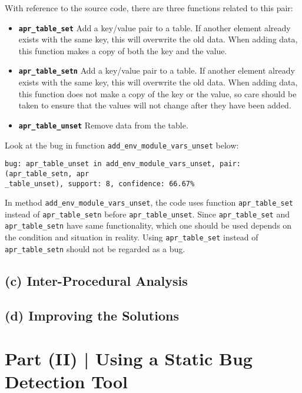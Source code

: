 \documentclass[12pt]{article}
\begin{document}
\begin{enumerate}
With reference to the source code, there are three functions related to this pair:
\begin{itemize}
\item \texttt{\bf apr\_table\_set}  Add a key/value pair to a table. If another element already exists with the same key, this will overwrite the old data. When adding data, this function makes a copy of both the key and the value.
\item \texttt{\bf apr\_table\_setn} Add a key/value pair to a table. If another element already exists with the same key, this will overwrite the old data. When adding data, this function does not make a copy of the key or the value, so care should be taken to ensure that the values will not change after they have been added.
\item \texttt{\bf apr\_table\_unset} Remove data from the table.
\end{itemize}

Look at the bug in function \texttt{add\_env\_module\_vars\_unset} below:

\begin{lstlisting}
bug: apr_table_unset in add_env_module_vars_unset, pair: (apr_table_setn, apr
_table_unset), support: 8, confidence: 66.67%
\end{lstlisting}

In method \texttt{add\_env\_module\_vars\_unset}, the code uses function \texttt{apr\_table\_set} instead of \texttt{apr\_table\_setn} before \texttt{apr\_table\_unset}. Since \texttt{apr\_table\_set} and \texttt{apr\_table\_setn} have same functionality, which one should be used depends on the condition and  situation in reality. Using \texttt{apr\_table\_set} instead of \texttt{apr\_table\_setn} should not be regarded as a bug. 

\end{enumerate}

\subsection*{(c) Inter-Procedural Analysis}



\subsection*{(d) Improving the Solutions}



\section*{Part (II) | Using a Static Bug Detection Tool}
\end{document}
